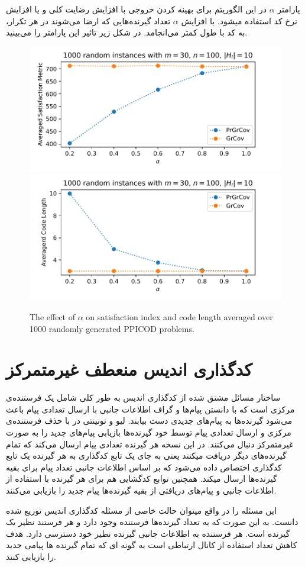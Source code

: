 پارامتر 
$\alpha$
در این الگوریتم برای بهینه کردن خروجی با افزایش رضایت کلی و یا افزایش نرخ کد استفاده میشود. با افزایش 
$\alpha$
تعداد گیرنده‌هایی که ارضا می‌شوند در هر تکرار، به کد با طول کمتر می‌انجامد. در شکل زیر تاثیر این پارامتر را می‌بینید.
\begin{figure}[H]
	\centering
	{\includegraphics[width=0.4\linewidth]{figs/chapter4/cost_alpha_grcov_prgrcov.pdf}\vspace{-2ex}}
	{\includegraphics[width=0.4				\linewidth]{figs/chapter4/code_length_alpha_grcov_prgrcov.pdf}\vspace{-2ex}}
	\caption{The effect of $\alpha$ on satisfaction index and code length averaged over 1000 randomly generated PPICOD problems.}\label{fig:alpha}
\end{figure}

\section{کدگذاری اندیس منعطف غیرمتمرکز}
ساختار مسائل مشتق شده از کدگذاری اندیس به طور کلی شامل یک فرستنده‌ی مرکزی است که با دانستن پیام‌ها و گراف اطلاعات جانبی با ارسال تعدادی پیام باعث می‌شود گیرنده‌ها به پیام‌های جدیدی دست بیابند. لیو و تونینتی در
\cite{paper:Decentralized}
با حذف فرستنده‌ی مرکزی و ارسال تعدادی پیام توسط خود گیرنده‌ها بازیابی پیام‌های جدید را به صورت غیرمتمرکز دنبال می‌کنند. در این نسخه هر گیرنده تعدادی پیام ارسال می‌کند که تمام گیرنده‌های دیگر دریافت میکنند یعنی به جای یک تابع کدگذاری به هر گیرنده یک تابع کدگذاری اختصاص داده می‌شود که بر اساس اطلاعات جانبی تعداد پیام برای بقیه گیرنده‌ها ارسال میکند. همچنین توابع کدگشایی هم برای هر گیرنده با استفاده از اطلاعات جانبی و پیام‌های دریافتی از بقیه گیرنده‌ها پیام جدید را بازیابی می‌کنند.

این مسئله را در واقع میتوان حالت خاصی از مسئله کدگذاری اندیس توزیع شده
\cite{9022912}
دانست. به این صورت که به تعداد گیرنده‌ها فرستنده وجود دارد و هر فرستند نظیر یک گیرنده است. هر فرستنده به اطلاعات جانبی گیرنده نظیر خود دسترسی دارد. هدف کاهش تعداد استفاده از کانال ارتباطی است به گونه ای که تمام گیرنده ها پیامی جدید را بازیابی کنند.

